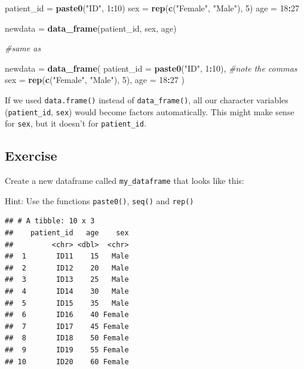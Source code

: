 \documentclass[]{book}
\makeatletter
\newenvironment{Shaded}{\begin{snugshade}}{\end{snugshade}}
\newcommand{\KeywordTok}[1]{\textcolor[rgb]{0.13,0.29,0.53}{\textbf{#1}}}
\newcommand{\DataTypeTok}[1]{\textcolor[rgb]{0.13,0.29,0.53}{#1}}
\newcommand{\DecValTok}[1]{\textcolor[rgb]{0.00,0.00,0.81}{#1}}
\newcommand{\StringTok}[1]{\textcolor[rgb]{0.31,0.60,0.02}{#1}}
\newcommand{\CommentTok}[1]{\textcolor[rgb]{0.56,0.35,0.01}{\textit{#1}}}
\newcommand{\OperatorTok}[1]{\textcolor[rgb]{0.81,0.36,0.00}{\textbf{#1}}}
\newcommand{\NormalTok}[1]{#1}
\newenvironment{kframe}{%
\medskip{}
\setlength{\fboxsep}{.8em}
 \def\at@end@of@kframe{}%
 \ifinner\ifhmode%
  \def\at@end@of@kframe{\end{minipage}}%
  \begin{minipage}{\columnwidth}%
 \fi\fi%
 \def\FrameCommand##1{\hskip\@totalleftmargin \hskip-\fboxsep
 \colorbox{shadecolor}{##1}\hskip-\fboxsep
     \hskip-\linewidth \hskip-\@totalleftmargin \hskip\columnwidth}%
 \MakeFramed {\advance\hsize-\width
   \@totalleftmargin\z@ \linewidth\hsize
   \@setminipage}}%
 {\par\unskip\endMakeFramed%
 \at@end@of@kframe}
\renewenvironment{Shaded}{\begin{kframe}}{\end{kframe}}
\makeatother
\begin{document}
\begin{Shaded}
\begin{Highlighting}[]
\NormalTok{patient_id =}\StringTok{ }\KeywordTok{paste0}\NormalTok{(}\StringTok{"ID"}\NormalTok{, }\DecValTok{1}\OperatorTok{:}\DecValTok{10}\NormalTok{)}
\NormalTok{sex        =}\StringTok{ }\KeywordTok{rep}\NormalTok{(}\KeywordTok{c}\NormalTok{(}\StringTok{"Female"}\NormalTok{, }\StringTok{"Male"}\NormalTok{), }\DecValTok{5}\NormalTok{)}
\NormalTok{age        =}\StringTok{ }\DecValTok{18}\OperatorTok{:}\DecValTok{27}

\NormalTok{newdata =}\StringTok{ }\KeywordTok{data_frame}\NormalTok{(patient_id, sex, age)}

\CommentTok{#same as}

\NormalTok{newdata      =}\StringTok{ }\KeywordTok{data_frame}\NormalTok{(}
  \DataTypeTok{patient_id =} \KeywordTok{paste0}\NormalTok{(}\StringTok{"ID"}\NormalTok{, }\DecValTok{1}\OperatorTok{:}\DecValTok{10}\NormalTok{), }\CommentTok{#note the commas}
  \DataTypeTok{sex        =} \KeywordTok{rep}\NormalTok{(}\KeywordTok{c}\NormalTok{(}\StringTok{"Female"}\NormalTok{, }\StringTok{"Male"}\NormalTok{), }\DecValTok{5}\NormalTok{),}
  \DataTypeTok{age        =} \DecValTok{18}\OperatorTok{:}\DecValTok{27}
\NormalTok{)}
\end{Highlighting}
\end{Shaded}

If we used \texttt{data.frame()} instead of \texttt{data\_frame()}, all
our character variables (\texttt{patient\_id}, \texttt{sex}) would
become factors automatically. This might make sense for \texttt{sex},
but it doesn't for \texttt{patient\_id}.

\subsection{Exercise}\label{exercise-15}

Create a new dataframe called \texttt{my\_dataframe} that looks like
this:

Hint: Use the functions \texttt{paste0()}, \texttt{seq()} and
\texttt{rep()}

\begin{verbatim}
## # A tibble: 10 x 3
##    patient_id   age    sex
##         <chr> <dbl>  <chr>
##  1       ID11    15   Male
##  2       ID12    20   Male
##  3       ID13    25   Male
##  4       ID14    30   Male
##  5       ID15    35   Male
##  6       ID16    40 Female
##  7       ID17    45 Female
##  8       ID18    50 Female
##  9       ID19    55 Female
## 10       ID20    60 Female
\end{verbatim}
\end{document}
